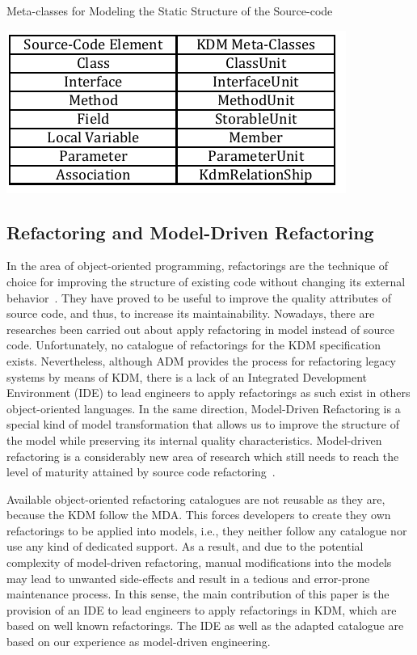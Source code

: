 \documentclass[12pt]{article}
\let\cite=\citep
\begin{document}
\begin{table}[!h]
\caption{Meta-classes for Modeling the Static Structure of the Source-code}
\label{tab:mappingCodeToKDM}
\centering
  \includegraphics[scale=1]{Figure/TabelaPAraUsarNoVEM}
\end{table}

\subsection{Refactoring and Model-Driven Refactoring}

In the area of object-oriented programming, refactorings are the technique of choice for improving the structure of existing code without changing its external behavior~\cite{refactImpro}. They have proved to be useful to improve the quality attributes of source code, and thus, to increase its maintainability. Nowadays, there are researches been carried out about apply refactoring in model instead of source code\cite{Ulrich:2010:IST:1841736}. Unfortunately, no catalogue of refactorings for the KDM specification exists. Nevertheless, although ADM provides the process for refactoring legacy systems by means of KDM, there is a lack of an Integrated Development Environment (IDE) to lead engineers to apply refactorings as such exist in others object-oriented languages. In the same direction, Model-Driven Refactoring is a special kind of model transformation that allows us to improve the structure of the model while preserving its internal quality characteristics. Model-driven refactoring is a considerably new area of research which still needs to reach the level of maturity attained by source code refactoring~\cite{ModelDrivenRefactoring}. 

Available object-oriented refactoring catalogues are not reusable as they are, because the KDM follow the MDA. This forces developers to create they own refactorings to be applied into models, i.e., they neither follow any catalogue nor use any kind of dedicated support. As a result, and due to the potential  complexity of model-driven refactoring, manual modifications into the models may lead to unwanted
side-effects and result in a tedious and error-prone maintenance process. In this sense, the main contribution of this paper is the provision of an IDE to lead engineers to apply refactorings in KDM, which are based on well known refactorings\cite{refactImpro}. The IDE as well as the adapted catalogue are based on our experience as model-driven engineering. %
\end{document}
